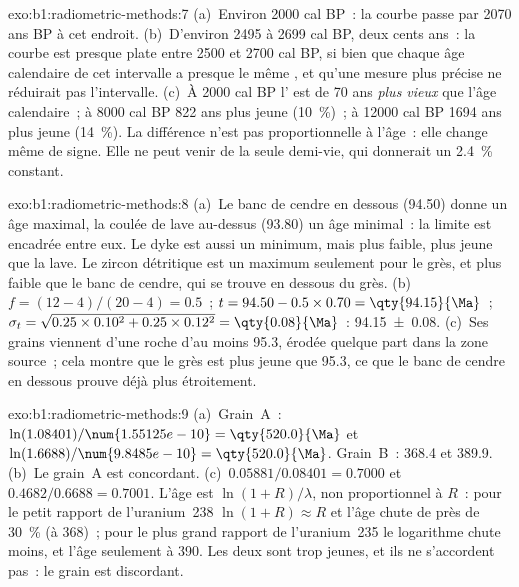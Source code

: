\begin{solution}{exo:b1:radiometric-methods:7}
(a)~Environ \num{2000} cal BP~: la courbe passe par \num{2070} ans BP à cet endroit.
(b)~D'environ \num{2495} à \num{2699} cal BP, deux cents ans~: la courbe est
presque plate entre \num{2500} et \num{2700} cal BP, si bien que chaque âge calendaire
de cet intervalle a presque le même , et qu'une mesure plus précise
ne réduirait pas l'intervalle. (c)~À \num{2000} cal BP l'
est de \num{70} ans \emph{plus vieux} que l'âge calendaire~; à \num{8000} cal BP
\num{822} ans plus jeune (\qty{10}{\percent})~; à \num{12000} cal BP \num{1694}
ans plus jeune (\qty{14}{\percent}). La différence n'est pas proportionnelle à
l'âge~: elle change même de signe. Elle ne peut venir de la seule demi-vie, qui
donnerait un \qty{2.4}{\percent} constant.
\end{solution}

\begin{solution}{exo:b1:radiometric-methods:8}
(a)~Le banc de cendre en dessous (\qty{94.50}{\Ma}) donne un âge maximal, la coulée de lave au-dessus
(\qty{93.80}{\Ma}) un âge minimal~: la limite est encadrée entre eux. Le dyke est
aussi un minimum, mais plus faible, plus jeune que la lave. Le zircon détritique est un
maximum seulement pour le grès, et plus faible que le banc de cendre, qui se trouve en dessous du
grès. (b)~$f = (12 - 4)/(20 - 4) = 0.5$~; $t = 94.50 - 0.5 \times 0.70 =
\qty{94.15}{\Ma}$~; $\sigma_t = \sqrt{0.25 \times 0.10^2 + 0.25 \times 0.12^2} =
\qty{0.08}{\Ma}$~: \qty[uncertainty-mode=separate]{94.15(8)}{\Ma}. (c)~Ses
grains viennent d'une roche d'au moins \qty{95.3}{\Ma}, érodée quelque part dans la
zone source~; cela montre que le grès est plus jeune que \qty{95.3}{\Ma}, ce que
le banc de cendre en dessous prouve déjà plus étroitement.
\end{solution}

\begin{solution}{exo:b1:radiometric-methods:9}
(a)~Grain~A~: $\ln(1.08401)/\num{1.55125e-10} = \qty{520.0}{\Ma}$ et
$\ln(1.6688)/\num{9.8485e-10} = \qty{520.0}{\Ma}$. Grain~B~: \qty{368.4}{\Ma} et
\qty{389.9}{\Ma}. (b)~Le grain~A est concordant. (c)~$0.05881/0.08401 = 0.7000$ et
$0.4682/0.6688 = 0.7001$. L'âge est $\ln(1 + R)/\lambda$, non proportionnel à
$R$~: pour le petit rapport de l'uranium~238 $\ln(1+R) \approx R$ et l'âge chute de
près de \qty{30}{\percent} (à \qty{368}{\Ma})~; pour le plus grand rapport de l'uranium~235
le logarithme chute moins, et l'âge seulement à \qty{390}{\Ma}. Les deux sont trop
jeunes, et ils ne s'accordent pas~: le grain est discordant.
\end{solution}

